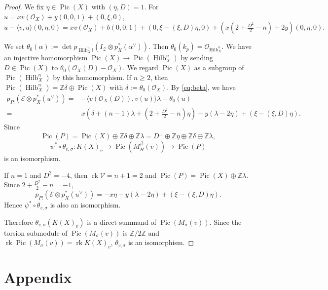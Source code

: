 \documentclass[leqno,11pt]{amsart}
\def\Z{\ensuremath{\mathbb{Z}}}
\def\Hilb{\mathop{\mathrm{Hilb}}\nolimits}
\def\Pic{\mathop{\mathrm{Pic}}\nolimits}
\def\rk{\mathop{\mathrm{rk}}}
\theoremstyle{definition}
\def\Z{\ensuremath{\mathbb{Z}}}
\def\EE{\ensuremath{\mathcal E}}
\def\OO{\ensuremath{\mathcal O}}
\def\VV{\ensuremath{\mathcal V}}
\def\ZZ{\ensuremath{\mathcal Z}}
\begin{document}
{\begin{proof}
We fix $\eta \in \Pic(X)$ with $(\eta,D)=1$. 
For $u=x v(\OO_X)+y(0,0,1)+(0,\xi,0)$,
\begin{equation}
u-\langle v,u \rangle(0,\eta,0)=
x v(\OO_X)+b(0,0,1)+(0,\xi-(\xi,D)\eta,0)+
(x(2+\tfrac{D^2}{2}-n)+2y)(0,\eta,0).
\end{equation} 

We set 
$\theta_0(\alpha):=\det p_{\Hilb_X^n !}(I_{\ZZ} \otimes p_X^*(\alpha^{\vee}))$.
Then $\theta_0(k_p)=\OO_{\Hilb_X^n}$.
We have an injective homomorphism
$\Pic(X) \to \Pic(\Hilb_X^n)$ 
by sending $D \in \Pic(X)$ to $\theta_0(\OO_X(D)-\OO_X)$.
We regard $\Pic(X)$ as a subgroup of $\Pic(\Hilb_X^n)$
by this homomorphism.
If $n \geq 2$, then
$\Pic(\Hilb_X^n)=\Z \delta \oplus \Pic(X)$ with 
$\delta:=\theta_0(\OO_X)$.
By \eqref{eq:beta}, we have
\begin{equation}
\begin{split}
p_{P!}(\EE \otimes p_X^*(u^{\vee}))=&
-\langle v(\OO_X(D)),v(u) \rangle\lambda
+\theta_0(u)\\
=&
x(\delta+(n-1)\lambda+(2+\tfrac{D^2}{2}-n)\eta)
-y(\lambda-2\eta)+(\xi-(\xi,D)\eta).
\end{split}
\end{equation}
Since
$$
\Pic(P)=\Pic(X) \oplus \Z \delta \oplus \Z \lambda=
D^\perp \oplus \Z \eta \oplus \Z \delta \oplus \Z \lambda,
$$
$$
\psi^* \circ \theta_{v,\sigma}:K(X)_v \to \Pic(M_H^\beta(v)) \to \Pic(P)
$$
is an isomorphism.

If $n=1$ and $D^2=-4$, then $\rk \VV=n+1=2$ and
$\Pic(P)=\Pic(X) \oplus \Z \lambda$.
Since  
$2+\tfrac{D^2}{2}-n=-1$, 
\begin{equation}
p_{P!}(\EE \otimes p_X^*(u^{\vee}))=
-x \eta-y(\lambda-2\eta)+(\xi-(\xi,D)\eta).
\end{equation}
Hence $\psi^* \circ \theta_{v,\sigma}$
is also an isomorphism.


Therefore $\theta_{v,\sigma} (K(X)_v)$ is a direct summand of $\Pic(M_\sigma(v))$.
Since the torsion submodule of $\Pic(M_\sigma(v))$ is
$\Z /2 \Z$ and $\rk \Pic(M_\sigma(v))=\rk K(X)_v$,
$\theta_{v,\sigma}$ is an isomorphism.
\end{proof}

}


\section{Appendix}\label{App: exceptional case}
\end{document}
